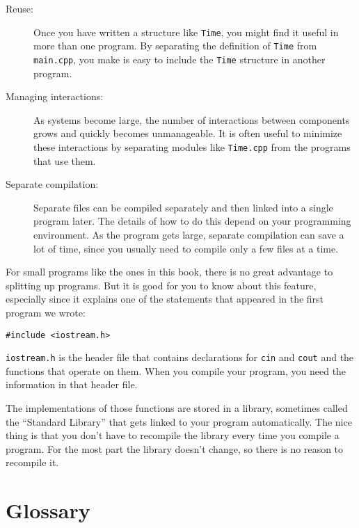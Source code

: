\begin{description}

\item[Reuse:]  Once you have written a structure like {\tt Time},
you might find it useful in more than one program.  By separating
the definition of {\tt Time} from {\tt main.cpp}, you make is easy
to include the {\tt Time} structure in another program.

\item[Managing interactions:]  As systems become large, the number
of interactions between components grows and quickly becomes
unmanageable.  It is often useful to minimize these interactions
by separating modules like {\tt Time.cpp} from the programs that
use them.

\item[Separate compilation:]  Separate files can be compiled
separately and then linked into a single program later.  The details
of how to do this depend on your programming environment.  As
the program gets large, separate compilation can save a lot of time,
since you usually need to compile only a few files at a time.

\end{description}

For small programs like the ones in this book, there is
no great advantage to splitting up programs.  But it is good
for you to know about this feature, especially since it explains
one of the statements that appeared in the first program we
wrote:

\begin{verbatim}
#include <iostream.h>
\end{verbatim}
%
{\tt iostream.h} is the header file that contains declarations
for {\tt cin} and {\tt cout} and the functions that operate on
them.  When you compile your program, you need the information
in that header file.

The implementations of those functions are stored in a library,
sometimes called the ``Standard Library'' that gets linked to
your program automatically.  The nice thing is that you don't
have to recompile the library every time you compile a program.
For the most part the library doesn't change, so there is no
reason to recompile it.

\section{Glossary}

